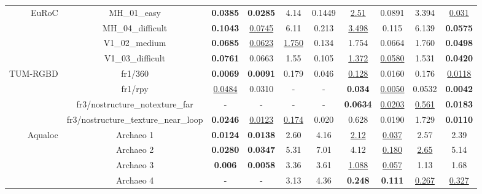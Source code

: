 \begin{table*}[ht!]
{\begin{tabular}{rccccccccc}
\midrule
\multirow{4}{*}{EuRoC \cite{dataset:burri2016euroc}} 
                                & MH\_01\_easy       & \textbf{0.0385} & \textbf{0.0285}    &  4.14  & 0.1449  & \underline{2.51}  & 0.0891   & 3.394  & \underline{0.031} \\
                                & MH\_04\_difficult  & \textbf{0.1043} & \underline{0.0745}    &  6.11  & 0.213   & \underline{3.498}  & 0.115   & 6.139  & \textbf{0.0575} \\
                                & V1\_02\_medium     & \textbf{0.0685} & \underline{0.0623}    &  \underline{1.750}  & 0.134   & 1.754  & 0.0664  & 1.760   & \textbf{0.0498}  \\
                                & V1\_03\_difficult  & \textbf{0.0761} & 0.0663    &  1.55  & 0.105   & \underline{1.372}  & \underline{0.0580}  & 1.531   & \textbf{0.0420} \\
\midrule
\multirow{4}{*}{TUM-RGBD \cite{sturm2012tumrgbd}} 
                                & fr1/360       & \textbf{0.0069} & \textbf{0.0091}  & 0.179  & 0.046 & \underline{0.128}   & 0.0160 & 0.176  & \underline{0.0118} \\
                                & fr1/rpy       & \underline{0.0484} & 0.0310  &  -     & -     & \textbf{0.034 } & \underline{0.0050} & 0.0532 & \textbf{0.0042} \\
                                & fr3/nostructure\_notexture\_far   & -      & -       & -      & -     & \textbf{0.0634}  & \underline{0.0203} & \underline{0.561}  & \textbf{0.0183} \\
                                & fr3/nostructure\_texture\_near\_loop  & \textbf{0.0246} & \underline{0.0123}  & \underline{0.174}  & 0.020 & 0.628   & 0.0190 & 1.729  & \textbf{0.0110} \\

\midrule
\multirow{4}{*}{Aqualoc \cite{dataset:aqualocdb}} 
                                & Archaeo 1   & \textbf{0.0124} & \textbf{0.0138}  & 2.60 & 4.16 &  \underline{2.12}   & \underline{0.037} & 2.57 &  2.39  \\
                                & Archaeo 2   & \textbf{0.0280 }& \textbf{0.0347}  & 5.31 & 7.01 &  4.12   & \underline{0.180} & \underline{2.65} &  5.14  \\
                                & Archaeo 3   &\textbf{ 0.006}  & \textbf{0.0058} & 3.36 & 3.61 &  \underline{1.088}  & \underline{0.057} & 1.13 &  1.68  \\
                                & Archaeo 4   & -      &  -      & 3.13 & 4.36 &  \textbf{0.248}  & \textbf{0.111} & \underline{0.267} & \underline{0.327} \\


\end{tabular}}
\end{table*}
